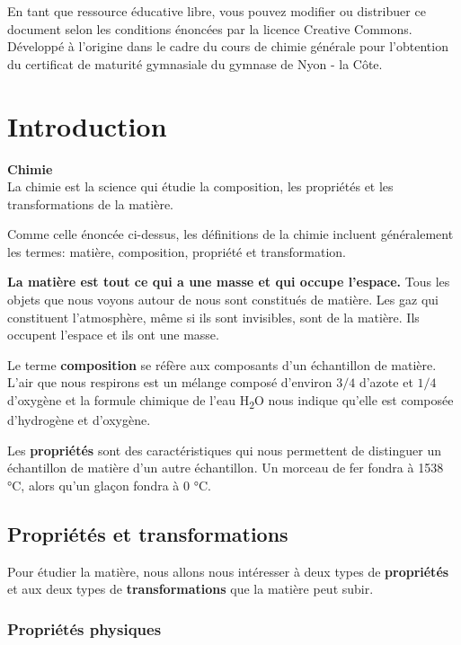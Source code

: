 \documentclass[
  11pt,
  french,
  a4paper,
  openany]{book}
\begin{document}
En tant que ressource éducative libre, vous pouvez modifier ou distribuer ce document selon les conditions énoncées par la licence Creative Commons. Développé à l'origine dans le cadre du cours de chimie générale pour l'obtention du certificat de maturité gymnasiale du gymnase de Nyon - la Côte.

\hypertarget{introduction}{%
\chapter{Introduction}\label{introduction}}

\begin{tcolorbox}
\textbf{Chimie}\\
La chimie est la science qui étudie la composition, les propriétés et les transformations de la matière.

\end{tcolorbox}

Comme celle énoncée ci-dessus, les définitions de la chimie incluent généralement les termes: matière, composition, propriété et transformation.

\textbf{La matière est tout ce qui a une masse et qui occupe l'espace.} Tous les objets que nous voyons autour de nous sont constitués de matière. Les gaz qui constituent l'atmosphère, même si ils sont invisibles, sont de la matière. Ils occupent l'espace et ils ont une masse.

Le terme \textbf{composition} se réfère aux composants d'un échantillon de matière. L'air que nous respirons est un mélange composé d'environ \(3/4\) d'azote et \(1/4\) d'oxygène et la formule chimique de l'eau H\textsubscript{2}O nous indique qu'elle est composée d'hydrogène et d'oxygène.

Les \textbf{propriétés} sont des caractéristiques qui nous permettent de distinguer un échantillon de matière d'un autre échantillon. Un morceau de fer fondra à 1538 °C, alors qu'un glaçon fondra à 0 °C.

\hypertarget{propriuxe9tuxe9s-et-transformations}{%
\section{Propriétés et transformations}\label{propriuxe9tuxe9s-et-transformations}}

Pour étudier la matière, nous allons nous intéresser à deux types de \textbf{propriétés} et aux deux types de \textbf{transformations} que la matière peut subir.

\hypertarget{propriuxe9tuxe9s-physiques}{%
\subsection{Propriétés physiques}\label{propriuxe9tuxe9s-physiques}}
\end{document}
